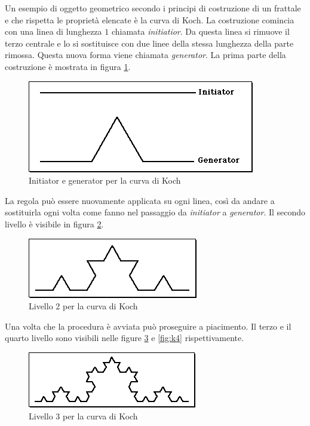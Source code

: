 \documentclass[11pt,a4paper,appendixprefix=true,numbers=noenddot]{scrreprt}
\begin{document}
Un esempio di oggetto geometrico secondo i principi di costruzione di un frattale e che rispetta le proprietà elencate è la curva di Koch. La costruzione comincia con una linea di lunghezza $1$ chiamata \emph{initiatior}. Da questa linea si rimuove il terzo centrale e lo si sostituisce con due linee della stessa lunghezza della parte rimossa. Questa nuova forma viene chiamata \emph{generator}. La prima parte della costruzione è mostrata in figura \ref{fig:k1}.

\begin{figure}[!ht]
\centering
\includegraphics[scale=0.55]{images/koch1.png}
\caption{Initiator e generator per la curva di Koch}
\label{fig:k1}
\end{figure}

La regola può essere nuovamente applicata su ogni linea, così da andare a sostituirla ogni volta come fanno nel passaggio da \emph{initiator} a \emph{generator}. Il secondo livello è visibile in figura \ref{fig:k2}.

\begin{figure}[!ht]
\centering
\includegraphics[scale=0.55]{images/koch2.png}
\caption{Livello 2 per la curva di Koch}
\label{fig:k2}
\end{figure}

\FloatBarrier

Una volta che la procedura è avviata può proseguire a piacimento. Il terzo e il quarto livello sono visibili nelle figure \ref{fig:k3} e \ref{fig:k4} rispettivamente.

\begin{figure}[!ht]
\centering
\includegraphics[scale=0.55]{images/koch3.png}
\caption{Livello 3 per la curva di Koch}
\label{fig:k3}
\end{figure}
\end{document}
